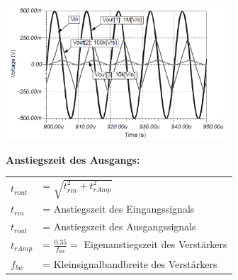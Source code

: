 			\begin{minipage}{8cm}
				\includegraphics[height=5cm]{./images/slew-rate.png}\\
			\end{minipage}
			\begin{minipage}{8cm}
				{\bf Anstiegszeit des Ausgangs:} \\
				\begin{tabular}{ll}
					$t_{rout}$ & = $\sqrt{t_{rin}^2 + t_{rAmp}^2}$ \\
					$t_{rin}$  & = Anstiegszeit des Eingangssignals \\
					$t_{rout}$ & = Anstiegszeit des Ausgangssignals \\
					$t_{rAmp}$ & = $\frac{0.35}{f_{bw}} = $ Eigenanstiegszeit des Verstärkers \\
					$f_{bw}$   & = Kleinsignalbandbreite des Verstärkers \\
				\end{tabular}
			\end{minipage}
			
